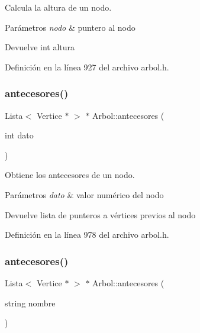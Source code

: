 Calcula la altura de un nodo. 


\begin{DoxyParams}{Parámetros}
{\em nodo} & puntero al nodo \\
\hline
\end{DoxyParams}
\begin{DoxyReturn}{Devuelve}
int altura 
\end{DoxyReturn}


Definición en la línea 927 del archivo arbol.\+h.

\mbox{\label{classArbol_ac7ff5e2f436a1e83e24cbdd0b2cc827b}} 
\subsubsection{\texorpdfstring{antecesores()}{antecesores()}\hspace{0.1cm}{\footnotesize\ttfamily [1/2]}}
{\footnotesize\ttfamily Lista$<$ Vertice $\ast$ $>$ $\ast$ Arbol\+::antecesores (\begin{DoxyParamCaption}\item[{int}]{dato }\end{DoxyParamCaption})}



Obtiene los antecesores de un nodo. 


\begin{DoxyParams}{Parámetros}
{\em dato} & valor numérico del nodo \\
\hline
\end{DoxyParams}
\begin{DoxyReturn}{Devuelve}
lista de punteros a vértices previos al nodo 
\end{DoxyReturn}


Definición en la línea 978 del archivo arbol.\+h.

\mbox{\label{classArbol_aa975d5d9cf5fcfc392a8200bd0078d1c}} 
\subsubsection{\texorpdfstring{antecesores()}{antecesores()}\hspace{0.1cm}{\footnotesize\ttfamily [2/2]}}
{\footnotesize\ttfamily Lista$<$ Vertice $\ast$ $>$ $\ast$ Arbol\+::antecesores (\begin{DoxyParamCaption}\item[{string}]{nombre }\end{DoxyParamCaption})}




